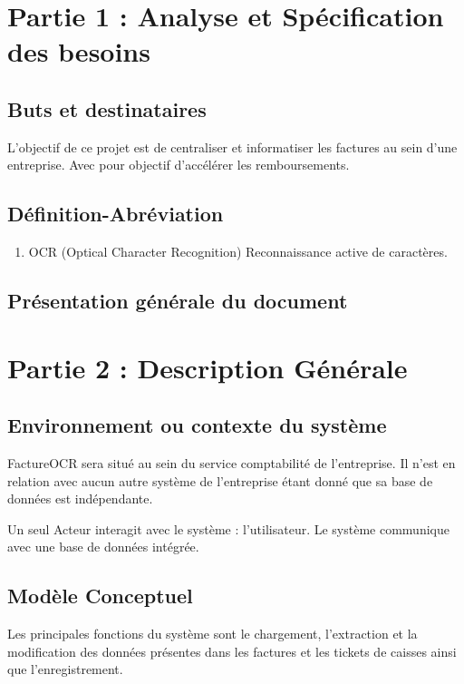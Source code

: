 \documentclass[a4paper,10pt]{article}
\title{}
\author{}
\begin{document}
\maketitle

\begin{abstract}

\end{abstract}


\section{Partie 1 : Analyse et Spécification des besoins}
\subsection{Buts et destinataires}
L'objectif de ce projet est de centraliser et informatiser les factures au sein d'une entreprise.
Avec pour objectif d'accélérer les remboursements.

\subsection{Définition-Abréviation}
\begin{enumerate}
\item{OCR} (Optical Character Recognition) Reconnaissance active de caractères.
\end{enumerate}

\subsection{Présentation générale du document}


\section{Partie 2 : Description Générale}
\subsection{Environnement ou contexte du système}
FactureOCR sera situé au sein du service comptabilité de l'entreprise.
Il n'est en relation avec aucun autre système de l'entreprise étant donné que sa base de données est indépendante.

Un seul Acteur interagit avec le système : l'utilisateur. Le système communique avec une base de données intégrée. 

\subsection{Modèle Conceptuel}
Les principales fonctions du système sont le chargement, l'extraction et la modification des données présentes dans les factures et les tickets de caisses ainsi que l'enregistrement.
\end{document}
